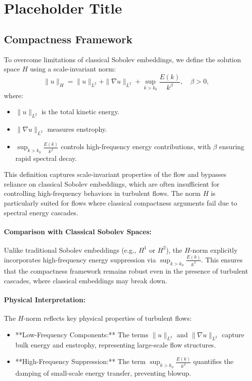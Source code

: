\section{Placeholder Title}

\subsection{Compactness Framework}
To overcome limitations of classical Sobolev embeddings, we define the solution space $H$ using a scale-invariant norm:
\[
\|u\|_H = \|u\|_{L^2} + \|\nabla u\|_{L^2} + \sup_{k > k_0} \frac{E(k)}{k^\beta}, \quad \beta > 0,
\]
where:
\begin{itemize}
    \item $\|u\|_{L^2}$ is the total kinetic energy.
    \item $\|\nabla u\|_{L^2}$ measures enstrophy.
    \item $\sup_{k > k_0} \frac{E(k)}{k^\beta}$ controls high-frequency energy contributions, with $\beta$ ensuring rapid spectral decay.
\end{itemize}

This definition captures scale-invariant properties of the flow and bypasses reliance on classical Sobolev embeddings, which are often insufficient for controlling high-frequency behaviors in turbulent flows. The norm $H$ is particularly suited for flows where classical compactness arguments fail due to spectral energy cascades.

\paragraph{Comparison with Classical Sobolev Spaces:}
Unlike traditional Sobolev embeddings (e.g., $H^1$ or $H^2$), the $H$-norm explicitly incorporates high-frequency energy suppression via $\sup_{k > k_0} \frac{E(k)}{k^\beta}$. This ensures that the compactness framework remains robust even in the presence of turbulent cascades, where classical embeddings may break down.

\paragraph{Physical Interpretation:}
The $H$-norm reflects key physical properties of turbulent flows:
\begin{itemize}
    \item **Low-Frequency Components:** The terms $\|u\|_{L^2}$ and $\|\nabla u\|_{L^2}$ capture bulk energy and enstrophy, representing large-scale flow structures.
    \item **High-Frequency Suppression:** The term $\sup_{k > k_0} \frac{E(k)}{k^\beta}$ quantifies the damping of small-scale energy transfer, preventing blowup.
\end{itemize}

